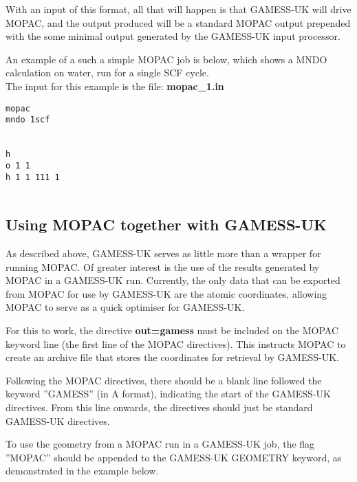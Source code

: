 \documentclass[11pt]{book}
\begin{document}
With an input of this format, all that will happen is that GAMESS-UK
will drive MOPAC, and the output produced will be a standard MOPAC
output prepended with the some minimal output generated by the
GAMESS-UK input processor.

An example of a such a simple MOPAC job is below, which shows a MNDO
calculation on water, run for a single SCF cycle.\\

The input for this example is the file: {\footnotesize \textbf{mopac\_1.in}}
{
\footnotesize
\begin{verbatim}
mopac
mndo 1scf


h
o 1 1
h 1 1 111 1


\end{verbatim}
}

\subsection{Using MOPAC together with GAMESS-UK}
As described above, GAMESS-UK serves as little more than a wrapper for
running MOPAC. Of greater interest is the use of the results generated
by MOPAC in a GAMESS-UK run. Currently, the only data that can be
exported from MOPAC for use by GAMESS-UK are the atomic coordinates,
allowing MOPAC to serve as a quick optimiser for GAMESS-UK.

For this to work, the directive {\footnotesize\textbf{out=gamess}}
must be included on the MOPAC keyword line (the first line of the
MOPAC directives). This instructs MOPAC to create an archive file that
stores the coordinates for retrieval by GAMESS-UK.

Following the MOPAC directives, there should be a blank line followed
the keyword ''GAMESS'' (in A format), indicating the start of the
GAMESS-UK directives. From this line onwards, the directives should
just be standard GAMESS-UK directives.

To use the geometry from a MOPAC run in a GAMESS-UK job, the flag
''MOPAC'' should be appended to the GAMESS-UK GEOMETRY keyword, as
demonstrated in the example below.\\
\end{document}

